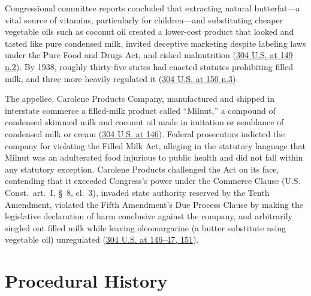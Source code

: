 \documentclass[12pt]{article}
\begin{document}
Congressional committee reports concluded that extracting natural butterfat---a vital source of vitamins, particularly for children---and substituting cheaper vegetable oils such as coconut oil created a lower-cost product that looked and tasted like pure condensed milk, invited deceptive marketing despite labeling laws under the Pure Food and Drugs Act, and risked malnutrition (\href{https://supreme.justia.com/cases/federal/us/304/144/}{304 U.S. at 149 n.2}). By 1938, roughly thirty-five states had enacted statutes prohibiting filled milk, and three more heavily regulated it (\href{https://supreme.justia.com/cases/federal/us/304/144/}{304 U.S. at 150 n.3}).

The appellee, Carolene Products Company, manufactured and shipped in interstate commerce a filled-milk product called ``Milnut,'' a compound of condensed skimmed milk and coconut oil made in imitation or semblance of condensed milk or cream (\href{https://supreme.justia.com/cases/federal/us/304/144/}{304 U.S. at 146}). Federal prosecutors indicted the company for violating the Filled Milk Act, alleging in the statutory language that Milnut was an adulterated food injurious to public health and did not fall within any statutory exception. Carolene Products challenged the Act on its face, contending that it exceeded Congress's power under the Commerce Clause (U.S. Const.~art.~I, \S~8, cl.~3), invaded state authority reserved by the Tenth Amendment, violated the Fifth Amendment's Due Process Clause by making the legislative declaration of harm conclusive against the company, and arbitrarily singled out filled milk while leaving oleomargarine (a butter substitute using vegetable oil) unregulated (\href{https://supreme.justia.com/cases/federal/us/304/144/}{304 U.S. at 146--47, 151}).

\section{Procedural History}
\end{document}
